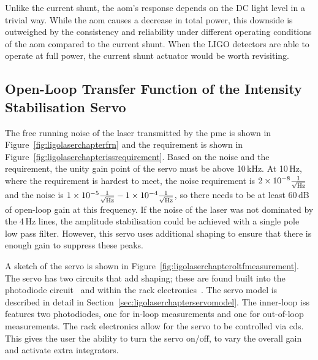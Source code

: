 \par
Unlike the current shunt, the \gls{aom}'s response depends on the DC light level in a trivial way. While the \gls{aom} causes a decrease in total power, this downside is outweighed by the consistency and reliability under different operating conditions of the \gls{aom} compared to the current shunt. When the LIGO detectors are able to operate at full power, the current shunt actuator would be worth revisiting.
\subsection{Open-Loop Transfer Function of the Intensity Stabilisation Servo}
The free running noise of the laser transmitted by the \gls{pmc} is shown in Figure~\ref{fig:ligolaserchapterfrn} and the requirement is shown in Figure~\ref{fig:ligolaserchapterissrequirement}. Based on the noise and the requirement, the unity gain point of the servo must be above 10\,\si{\kilo\hertz}. At 10\,\si{\hertz}, where the requirement is hardest to meet, the noise requirement is $2\times10^{-8} \frac{1}{\sqrt{\rm{Hz}}}$ and the noise is $1\times10^{-5}\frac{1}{\sqrt{\rm{Hz}}} - 1\times10^{-4} \frac{1}{\sqrt{\rm{Hz}}}$, so there needs to be at least 60\,dB of open-loop gain at this frequency. If the noise of the laser was not dominated by the 4\,Hz lines, the amplitude stabilisation could be achieved with a single pole low pass filter. However, this servo uses additional shaping to ensure that there is enough gain to suppress these peaks.
\par
A sketch of the servo is shown in Figure~\ref{fig:ligolaserchapteroltfmeasurement}. The servo has two circuits that add shaping; these are found built into the photodiode circuit~\cite{ISS_inner_loop_photodiode} and within the rack electronics~\cite{ISS_inner_loop_rack}. The servo model is described in detail in Section~\ref{sec:ligolaserchapterservomodel}. The inner-loop \gls{iss} features two photodiodes, one for in-loop measurements and one for out-of-loop measurements. The rack electronics allow for the servo to be controlled via \gls{cds}. This gives the user the ability to turn the servo on/off, to vary the overall gain and activate extra integrators.
